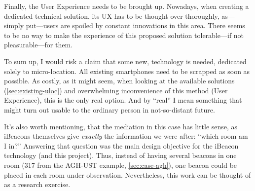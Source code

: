 Finally, the User Experience needs to be brought up. Nowadays, when creating a dedicated technical solution, its UX has to be thought over thoroughly, as---simply put---users are spoiled by constant innovations in this area. There seems to be no way to make the experience of this proposed solution tolerable---if not pleasurable---for them.


To sum up, I would risk a claim that some new, technology is needed, dedicated solely to micro-location. All existing smartphones need to be scrapped as soon as possible. As costly, as it might seem, when looking at the available solutions (\cref{sec:existing-uloc}) and overwhelming inconvenience of this method (User Experience), this is the only real option. And by ``real'' I mean something that might turn out usable to the ordinary person in not-so-distant future.

It's also worth mentioning, that the mediation in this case has little sense, as iBeacons themselves give \emph{exactly} the information we were after: ``which room am I in?'' Answering that question was the main design objective for the iBeacon technology (and this project). Thus, instead of having several beacons in one room (317 from the AGH-UST example, \cref{sec:case-agh}), one beacon could be placed in each room under observation. Nevertheless, this work can be thought of as a research exercise.
